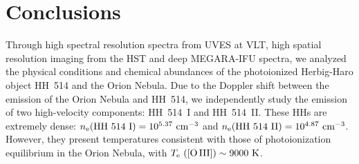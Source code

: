 \documentclass[fleqn,usenatbib]{mnras}
\begin{document}
 







\section{Conclusions}
\label{sec:summary_and_conclusions}


Through high spectral resolution spectra from UVES at VLT, high spatial resolution imaging from the HST and deep MEGARA-IFU spectra, we analyzed the physical conditions and chemical abundances of the photoionized Herbig-Haro object HH~514 and the Orion Nebula. 
Due to the Doppler shift between the emission of the Orion Nebula and HH~514, we independently study the emission of two high-velocity components: HH~514~I and HH~514~II. These HHs are extremely dense: $n_{\rm e}(\text{HH~514~I})=10^{5.37} \text{ cm}^{-3}$ and $n_{\rm e}(\text{HH~514~II})=10^{4.87} \text{ cm}^{-3}$. However, they present temperatures consistent with those of photoionization equilibrium in the Orion Nebula, with $T_{\rm e} \text{ ([O\thinspace III])} \sim 9000\text{ K}$.
\end{document}
